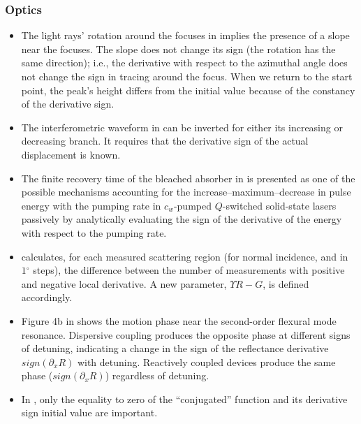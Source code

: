 \documentclass[11pt]{book}
\begin{document}
\subsubsection{Optics}
\begin{itemize}
\item The light rays' rotation around the focuses in \cite{aksenov2002wave}
implies the presence of a slope near the focuses. The slope does not
change its sign (the rotation has the same direction); i.e., the derivative
with respect to the azimuthal angle does not change the sign in tracing
around the focus. When we return to the start point, the peak's height
differs from the initial value because of the constancy of the derivative
sign.
\item The interferometric waveform in \cite{giuliani2005laser}
can be inverted for either its increasing or decreasing branch. It
requires that the derivative sign of the actual displacement is known.
\item The finite recovery time of the bleached absorber in \cite{li2006maximum}
is presented as one of the possible mechanisms accounting for the
increase--maximum--decrease in pulse energy with the pumping rate
in $c_{w}$-pumped $Q$-switched solid-state lasers passively by analytically
evaluating the sign of the derivative of the energy with respect to
the pumping rate.
\item \cite{sanz2011polar}
calculates, for each measured scattering region (for normal incidence,
and in $1{^\circ}$ steps), the difference between the number of measurements
with positive and negative local derivative. A new parameter, $\Upsilon R-G$,
is defined accordingly.
\item Figure 4b in \cite{roxworthy2018electrically}
shows the motion phase near the second-order flexural mode resonance.
Dispersive coupling produces the opposite phase at different signs
of detuning, indicating a change in the sign of the reflectance derivative
$sign(\partial_{x}R)$ with detuning. Reactively coupled devices produce
the same phase ($sign\left(\partial_{x}R\right)$) regardless of detuning.
\item In \cite{schitov2019optics},
only the equality to zero of the \textquotedblleft conjugated\textquotedblright{}
function and its derivative sign initial value are important.
\end{itemize}
\end{document}

